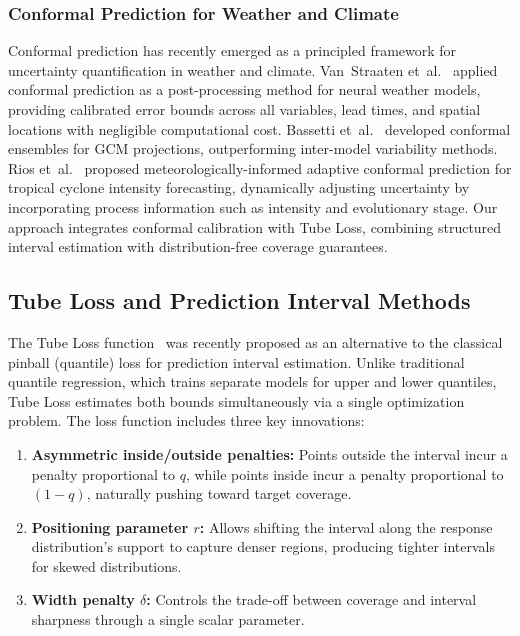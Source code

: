 \documentclass[conference]{IEEEtran}
\begin{document}
\subsubsection{Conformal Prediction for Weather and Climate}

Conformal prediction has recently emerged as a principled framework for uncertainty quantification in weather and climate. Van~Straaten et~al.~\cite{vanstraaten2025} applied conformal prediction as a post-processing method for neural weather models, providing calibrated error bounds across all variables, lead times, and spatial locations with negligible computational cost. Bassetti et~al.~\cite{bassetti2024} developed conformal ensembles for GCM projections, outperforming inter-model variability methods. Rios et~al.~\cite{rios2025} proposed meteorologically-informed adaptive conformal prediction for tropical cyclone intensity forecasting, dynamically adjusting uncertainty by incorporating process information such as intensity and evolutionary stage. Our approach integrates conformal calibration with Tube Loss, combining structured interval estimation with distribution-free coverage guarantees.

\subsection{Tube Loss and Prediction Interval Methods}

The Tube Loss function~\cite{anand2024} was recently proposed as an alternative to the classical pinball (quantile) loss for prediction interval estimation. Unlike traditional quantile regression, which trains separate models for upper and lower quantiles, Tube Loss estimates both bounds simultaneously via a single optimization problem. The loss function includes three key innovations:
\begin{enumerate}
    \item \textbf{Asymmetric inside/outside penalties:} Points outside the interval incur a penalty proportional to $q$, while points inside incur a penalty proportional to $(1-q)$, naturally pushing toward target coverage.
    \item \textbf{Positioning parameter $r$:} Allows shifting the interval along the response distribution's support to capture denser regions, producing tighter intervals for skewed distributions.
    \item \textbf{Width penalty $\delta$:} Controls the trade-off between coverage and interval sharpness through a single scalar parameter.
\end{enumerate}
\end{document}
